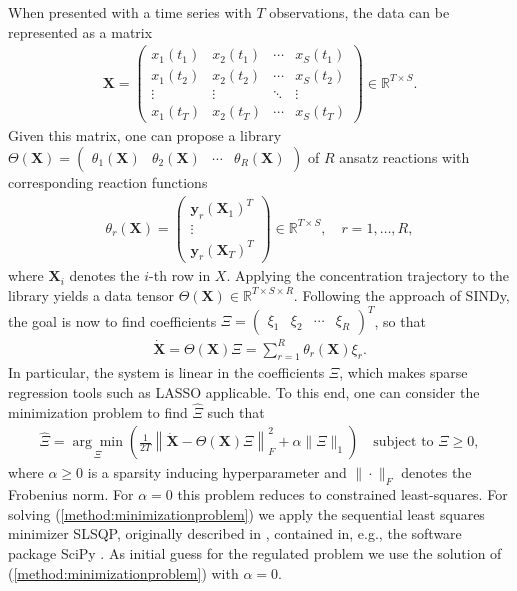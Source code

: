 \documentclass[oneside, abstracton, titlepage]{scrartcl}
\begin{document}
	When presented with a time series with $T$ observations, the data can be represented as a matrix
	\begin{align}
	\textbf{X} = \begin{pmatrix}
		x_1(t_1) & x_2(t_1) & \cdots & x_S(t_1) \\
		x_1(t_2) & x_2(t_2) & \cdots & x_S(t_2) \\
		\vdots   & \vdots   & \ddots & \vdots   \\
		x_1(t_T) & x_2(t_T) & \cdots & x_S(t_T)
	\end{pmatrix} \in \mathbb{R}^{T\times S}.
	\end{align}
	Given this matrix, one can propose a library $\Theta(\textbf{X}) = \begin{pmatrix} \theta_1(\textbf{X}) & \theta_2(\textbf{X}) & \cdots & \theta_R(\textbf{X}) \end{pmatrix}$ of $R$ ansatz reactions with corresponding reaction functions
	\begin{align}
		\theta_r(\textbf{X}) = \begin{pmatrix}
		\textbf{y}_r(\textbf{X}_1)^T \\ \vdots \\ \textbf{y}_r(\textbf{X}_T)^T
		\end{pmatrix}\in \mathbb{R}^{T\times S},\quad r=1,\ldots,R,
	\label{method:the-reactions}\end{align}
	where $\textbf{X}_i$ denotes the $i$-th row in $X$. Applying the concentration trajectory to the library yields a data tensor $\Theta(\textbf{X})\in\mathbb{R}^{T\times S\times R}$. Following the approach of SINDy, the goal is now to find coefficients $\Xi = \begin{pmatrix} \xi_1 & \xi_2 & \cdots & \xi_R
	\end{pmatrix}^T$, so that
	\begin{align}
	\dot{\textbf{X}} = \Theta(\textbf{X})\Xi = \sum_{r=1}^{R}\theta_r(\textbf{X})\xi_r.
	\end{align}
	In particular, the system is linear in the coefficients $\Xi$, which makes sparse regression tools such as LASSO \cite{Tibshirani1996, Hastie2009} applicable. To this end, one can consider the minimization problem to find $\hat{\Xi}$ such that
	\begin{align}
		\hat{\Xi} = \underset{\Xi}{\arg\min}\left( \frac{1}{2T}\left\| \dot{\textbf{X}} - \Theta(\textbf{X})\Xi \right\|_F^2 + \alpha\|\Xi\|_1 \right) \quad \text{subject to }\Xi \geq 0,
	\label{method:minimizationproblem}\end{align}
	where $\alpha\geq 0$ is a sparsity inducing hyperparameter and $\|\cdot\|_F$ denotes the Frobenius norm. For $\alpha=0$ this problem reduces to constrained least-squares. For solving (\ref{method:minimizationproblem}) we apply the sequential least squares minimizer SLSQP, originally described in \cite{Kraft1988}, contained in, e.g., the software package SciPy \cite{SciPy}. As initial guess for the regulated problem we use the solution of (\ref{method:minimizationproblem}) with $\alpha=0$.
	
\end{document}
